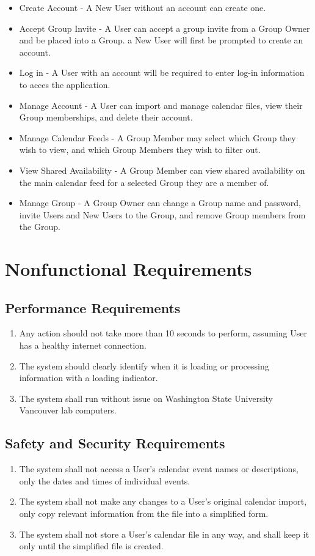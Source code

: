 \documentclass{scrreprt}
\begin{document}
\begin{itemize}
\item Create Account - A New User without an account can create one.
\item Accept Group Invite - A User can accept a group invite from a Group Owner and be placed into a Group.
a New User will first be prompted to create an account.
\item Log in - A User with an account will be required to enter log-in information to acces the application.
\item Manage Account - A User can import and manage calendar files, view their Group memberships, and delete
their account.
\item Manage Calendar Feeds - A Group Member may select which Group they wish to view, and which Group
Members they wish to filter out.
\item View Shared Availability - A Group Member can view shared availability on the main calendar feed for a
selected Group they are a member of.
\item Manage Group - A Group Owner can change a Group name and password, invite Users and New Users to the
Group, and remove Group members from the Group.
\end{itemize}

\chapter{Nonfunctional Requirements}

\section{Performance Requirements}
\begin{enumerate}
\item Any action should not take more than 10 seconds to perform, assuming User
has a healthy internet connection.
\item The system should clearly identify when it is loading or processing
information with a loading indicator.
\item The system shall run without issue on Washington State University Vancouver
lab computers.
\end{enumerate}

\section{Safety and Security Requirements}
\begin{enumerate}
\item The system shall not access a User's calendar event names or descriptions, 
only the dates and times of individual events.
\item The system shall not make any changes to a User's original calendar import,
only copy relevant information from the file into a simplified form.
\item The system shall not store a User's calendar file in any way, and shall
keep it only until the simplified file is created.
\end{enumerate}
\end{document}
